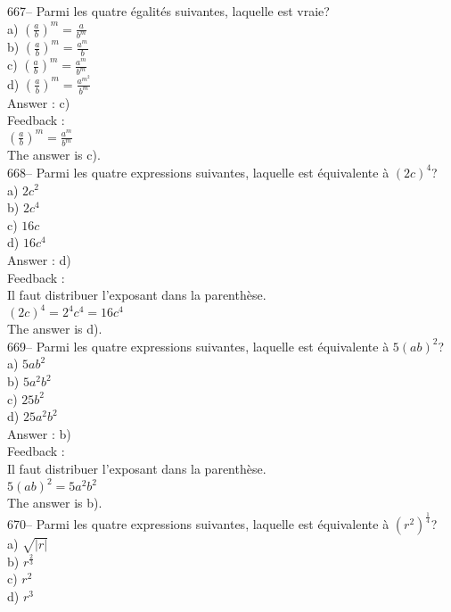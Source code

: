 ﻿\documentclass[letterpaper, 12pt]{article}
\begin{document}
667-- Parmi les quatre \'egalit\'es suivantes, laquelle est vraie?\\
a) $\left( \frac{a}{b}\right)^{m} =\frac{a}{b^{m}}$\\[2mm]
b) $\left( \frac{a}{b}\right)^{m} =\frac{a^{m}}{b}$\\[2mm]
c) $\left( \frac{a}{b}\right)^{m} =\frac{a^{m}}{b^{m}}$\\[2mm]
d) $\left( \frac{a}{b}\right)^{m} =\frac{a^{m^{2}}}{b^{m}}$\\

Answer : c)\\

Feedback : \\[2mm]
$\left( \frac{a}{b}\right)^{m} =\frac{a^{m}}{b^{m}}$\\[2mm]
The answer is c).\\

668-- Parmi les quatre expressions suivantes, laquelle est \'equivalente \`a
$\left( 2c\right) ^{4}$?\\
a) $2c^{2}$\\
b) $2c^{4}$\\
c) $16c$\\
d) $16c^{4}$\\

Answer : d)\\

Feedback : \\
Il faut distribuer l'exposant dans la parenth\`ese.\\
$\left( 2c\right) ^{4}=2^{4}c^{4}=16c^{4}$\\
The answer is d).\\

669-- Parmi les quatre expressions suivantes, laquelle est \'equivalente \`a
$5\left( ab\right) ^{2}$?\\
a) $5ab^{2}$\\
b) $5a^{2}b^{2}$\\
c) $25b^{2}$\\
d) $25a^{2}b^{2}$\\

Answer : b)\\

Feedback : \\
Il faut distribuer l'exposant dans la parenth\`ese.\\
$5\left( ab\right) ^{2}=5a^{2}b^{2}$\\
The answer is b).\\

670-- Parmi les quatre expressions suivantes, laquelle est \'equivalente \`a
$\left( r^{2}\right)^\frac{1}{4}$?\\
a) $\sqrt{|r|}$\\
b) $r^{\frac{2}{3}}$\\
c) $r^{2}$\\
d) $r^{3}$\\
\end{document}
